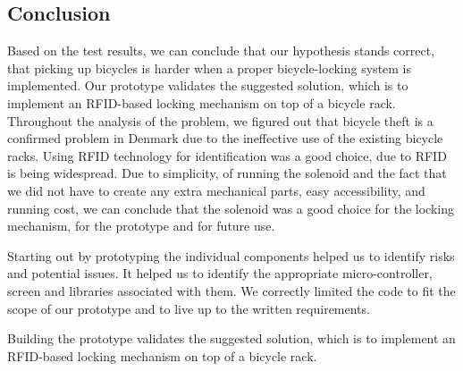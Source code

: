 \documentclass[twoside]{article}
\begin{document}
\begin{multicols}{2}
\section{Conclusion}
Based on the test results, we can conclude that our hypothesis stands correct, that picking up bicycles is harder when a proper bicycle-locking system is implemented. Our prototype validates the suggested solution, which is to implement an RFID-based locking mechanism on top of a bicycle rack. Throughout the analysis of the problem, we figured out that bicycle theft is a confirmed problem in Denmark due to the ineffective use of the existing bicycle racks. Using RFID technology for identification was a good choice, due to RFID is being widespread. Due to simplicity, of running the solenoid and the fact that we did not have to create any extra mechanical parts, easy accessibility, and running cost, we can conclude that the solenoid was a good choice for the locking mechanism, for the prototype and for future use.


Starting out by prototyping the individual components helped us to identify risks and potential issues. It helped us to identify the appropriate micro-controller, screen and libraries associated with them. We correctly limited the code to fit the scope of our prototype and to live up to the written requirements.


Building the prototype validates the suggested solution, which is to implement an RFID-based locking mechanism on top of a bicycle rack. 


{}

\end{multicols}
\end{document}
